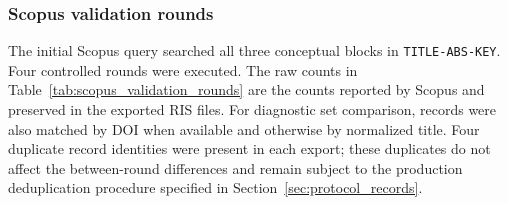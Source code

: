 \subsubsection{Scopus validation rounds}

The initial Scopus query searched all three conceptual blocks in
\texttt{TITLE-ABS-KEY}. Four controlled rounds were executed. The raw counts in
Table~\ref{tab:scopus_validation_rounds} are the counts reported by Scopus and
preserved in the exported RIS files. For diagnostic set comparison, records were
also matched by DOI when available and otherwise by normalized title. Four
duplicate record identities were present in each export; these duplicates do
not affect the between-round differences and remain subject to the production
deduplication procedure specified in Section~\ref{sec:protocol_records}.

